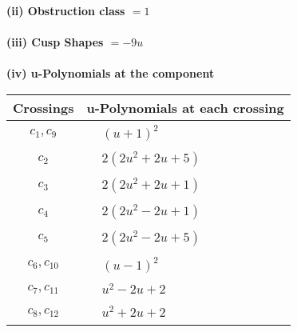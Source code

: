 \documentclass[1p]{elsarticle_modified}
\theoremstyle{definition}
\begin{document}
\flushleft \textbf{(ii) Obstruction class $= 1$}\\~\\
\flushleft \textbf{(iii) Cusp Shapes $= -9 u$}\\~\\
\newpage\renewcommand{\arraystretch}{1}
\flushleft \textbf{(iv) u-Polynomials at the component}\newline \\
\begin{tabular}{m{50pt}|m{274pt}}
Crossings & \hspace{64pt}u-Polynomials at each crossing \\
\hline $$\begin{aligned}c_{1},c_{9}\end{aligned}$$&$\begin{aligned}
&(u+1)^2
\end{aligned}$\\
\hline $$\begin{aligned}c_{2}\end{aligned}$$&$\begin{aligned}
&2(2 u^2+2 u+5)
\end{aligned}$\\
\hline $$\begin{aligned}c_{3}\end{aligned}$$&$\begin{aligned}
&2(2 u^2+2 u+1)
\end{aligned}$\\
\hline $$\begin{aligned}c_{4}\end{aligned}$$&$\begin{aligned}
&2(2 u^2-2 u+1)
\end{aligned}$\\
\hline $$\begin{aligned}c_{5}\end{aligned}$$&$\begin{aligned}
&2(2 u^2-2 u+5)
\end{aligned}$\\
\hline $$\begin{aligned}c_{6},c_{10}\end{aligned}$$&$\begin{aligned}
&(u-1)^2
\end{aligned}$\\
\hline $$\begin{aligned}c_{7},c_{11}\end{aligned}$$&$\begin{aligned}
&u^2-2 u+2
\end{aligned}$\\
\hline $$\begin{aligned}c_{8},c_{12}\end{aligned}$$&$\begin{aligned}
&u^2+2 u+2
\end{aligned}$\\
\hline
\end{tabular}\\~\\
\end{document}
